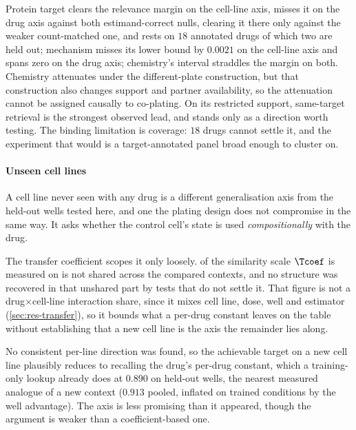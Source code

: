 Protein target clears the relevance margin on the cell-line axis, misses it on
the drug axis against both estimand-correct nulls, clearing it there only
against the weaker count-matched one, and rests on $18$ annotated drugs of which
two are held out; mechanism misses its lower bound by $0.0021$ on the cell-line
axis and spans zero on the drug axis; chemistry's interval straddles the margin
on both. Chemistry attenuates under the different-plate construction, but that
construction also changes support and partner availability, so the attenuation
cannot be assigned causally to co-plating. On its restricted support, same-target
retrieval is the strongest observed lead, and stands only as a direction worth
testing. The binding limitation is coverage: $18$ drugs cannot settle it, and
the experiment that would is a target-annotated panel broad enough to cluster
on.

\paragraph{Unseen cell lines} A cell line never seen with any drug is a
different generalisation axis from the held-out wells tested here, and one the
plating design does not compromise in the same way. It asks whether the control
cell's state is used \emph{compositionally} with the
drug.

The transfer coefficient scopes it only loosely.  of
the similarity scale $\Tcoef$ is measured on is not shared across the compared
contexts, and no structure was recovered in that unshared part by tests that do
not settle it. That figure is not a drug$\times$cell-line interaction share,
since it mixes cell line, dose, well and estimator (\cref{sec:res-transfer}), so
it bounds what a per-drug constant leaves on the table without establishing that
a new cell line is the axis the remainder lies along.

No consistent per-line direction was found, so the achievable target on a new
cell line plausibly reduces to recalling the drug's per-drug constant, which a
training-only lookup already does at $0.890$ on held-out wells, the nearest
measured analogue of a new context ($0.913$ pooled, inflated on trained
conditions by the well advantage). The axis is less promising than it appeared,
though the argument is weaker than a coefficient-based one.

